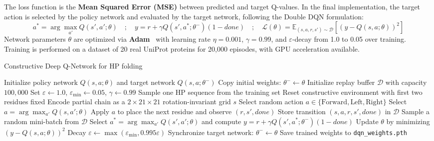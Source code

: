 The loss function is the \textbf{Mean Squared Error (MSE)} between predicted and target Q-values. In the final implementation, the target action is selected by the policy network and evaluated by the target network, following the Double DQN formulation:
\begin{equation}
    a^* = \arg\max_{a'} Q(s', a'; \theta)
    \quad ; \quad
    y = r + \gamma Q(s', a^*; \theta^-)(1-done)
    \quad ; \quad
    \mathcal{L}(\theta) = \mathbb{E}_{(s,a,r,s') \sim \mathcal{D}} \left[ \left( y - Q(s, a; \theta) \right)^2 \right]
    \label{eq:dqn_loss}
\end{equation}
Network parameters $\theta$ are optimized via \textbf{Adam}~\cite{kingma2015adam} with learning rate $\eta = 0.001$, $\gamma = 0.99$, and $\varepsilon$-decay from 1.0 to 0.05 over training. Training is performed on a dataset of 20 real UniProt proteins for 20,000 episodes, with GPU acceleration available.

\begin{algorithm}[H]
\caption{Constructive Deep Q-Network for HP folding}
\label{alg:dqn_constructive}
\begin{algorithmic}[1]
\State Initialize policy network $Q(s,a;\theta)$ and target network $Q(s,a;\theta^-)$
\State Copy initial weights: $\theta^- \leftarrow \theta$
\State Initialize replay buffer $\mathcal{D}$ with capacity $100{,}000$
\State Set $\varepsilon \leftarrow 1.0$, $\varepsilon_{\min} \leftarrow 0.05$, $\gamma \leftarrow 0.99$
    \State Sample one HP sequence from the training set
    \State Reset constructive environment with first two residues fixed
        \State Encode partial chain as a $2 \times 21 \times 21$ rotation-invariant grid $s$
            \State Select random action $a \in \{\text{Forward}, \text{Left}, \text{Right}\}$
        \Else
            \State Select $a = \arg\max_{a'} Q(s,a';\theta)$
        \EndIf
        \State Apply $a$ to place the next residue and observe $(r, s', done)$
        \State Store transition $(s,a,r,s',done)$ in $\mathcal{D}$
            \State Sample a random mini-batch from $\mathcal{D}$
            \State Select $a^* = \arg\max_{a'} Q(s',a';\theta)$ and compute $y = r + \gamma Q(s',a^*;\theta^-)(1-done)$
            \State Update $\theta$ by minimizing $\left(y - Q(s,a;\theta)\right)^2$
        \EndIf
    \EndWhile
    \State Decay $\varepsilon \leftarrow \max(\varepsilon_{\min}, 0.995\varepsilon)$
        \State Synchronize target network: $\theta^- \leftarrow \theta$
    \EndIf
\EndFor
\State Save trained weights to \texttt{dqn\_weights.pth}
\end{algorithmic}
\end{algorithm}

